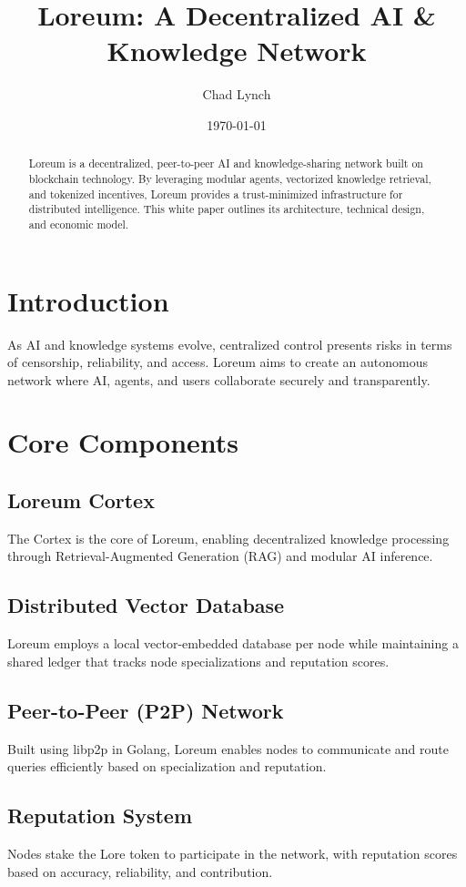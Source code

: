 \documentclass{article}
\title{Loreum: A Decentralized AI & Knowledge Network}
\author{Chad Lynch}
\date{\today}
\begin{document}
\maketitle

\begin{abstract}
Loreum is a decentralized, peer-to-peer AI and knowledge-sharing network built on blockchain technology. By leveraging modular agents, vectorized knowledge retrieval, and tokenized incentives, Loreum provides a trust-minimized infrastructure for distributed intelligence. This white paper outlines its architecture, technical design, and economic model.
\end{abstract}

\section{Introduction}
As AI and knowledge systems evolve, centralized control presents risks in terms of censorship, reliability, and access. Loreum aims to create an autonomous network where AI, agents, and users collaborate securely and transparently.

\section{Core Components}
\subsection{Loreum Cortex}
The Cortex is the core of Loreum, enabling decentralized knowledge processing through Retrieval-Augmented Generation (RAG) and modular AI inference.

\subsection{Distributed Vector Database}
Loreum employs a local vector-embedded database per node while maintaining a shared ledger that tracks node specializations and reputation scores.

\subsection{Peer-to-Peer (P2P) Network}
Built using libp2p in Golang, Loreum enables nodes to communicate and route queries efficiently based on specialization and reputation.

\subsection{Reputation System}
Nodes stake the Lore token to participate in the network, with reputation scores based on accuracy, reliability, and contribution.
\end{document}
